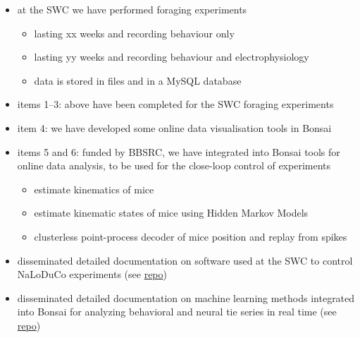 \begin{itemize}

    \item  at the SWC we have performed foraging experiments

    \begin{itemize}

        \item lasting xx weeks and recording behaviour only
        \item lasting yy weeks and recording behaviour and electrophysiology
        \item data is stored in files and in a MySQL database

    \end{itemize}

    \item  items 1--3: above have been completed for the SWC foraging experiments

    \item  item 4: we have developed some online data visualisation tools in Bonsai

    \item  items 5 and 6: funded by BBSRC, we have integrated into Bonsai tools for online data
  analysis, to be used for the close-loop control of experiments

    \begin{itemize}

        \item estimate kinematics of mice

        \item estimate kinematic states of mice using Hidden Markov Models

        \item clusterless point-process decoder of mice position and replay from spikes

    \end{itemize}

    \item  disseminated detailed documentation on software used at the SWC to control
        NaLoDuCo experiments (see
        \href{https://github.com/SainsburyWellcomeCentre/aeon_mecha.}{repo})

    \item  disseminated detailed documentation on machine learning methods integrated
  into Bonsai for analyzing behavioral and neural tie series in real time (see
        \href{https://bonsai-rx.org/machinelearning/.}{repo})

\end{itemize}

